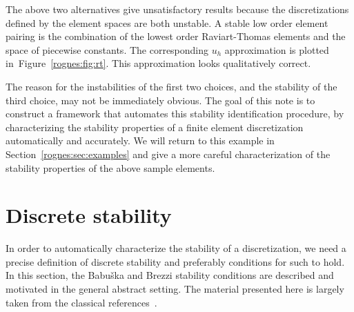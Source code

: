 The above two alternatives give unsatisfactory results because the
discretizations defined by the element spaces are both unstable. A
stable low order element pairing is the combination of the lowest
order Raviart-Thomas elements and the space of piecewise
constants\cite{RaviartThomas1977}. The corresponding $u_h$
approximation is plotted in~Figure~\ref{rognes:fig:rt}. This
approximation looks qualitatively correct.

The reason for the instabilities of the first two choices, and the
stability of the third choice, may not be immediately obvious. The
goal of this note is to construct a framework that automates this
stability identification procedure, by characterizing the stability
properties of a finite element discretization automatically and
accurately.  We will return to this example in
Section~\ref{rognes:sec:examples} and give a more careful
characterization of the stability properties of the above sample
elements.



\section{Discrete stability}

In order to automatically characterize the stability of a
discretization, we need a precise definition of discrete stability and
preferably conditions for such to hold. In this section, the Babu\v
ska and Brezzi stability conditions are described and motivated in the
general abstract setting. The material presented here is largely taken
from the classical references~\cite{Babuska1973, Brezzi1974,
  BrezziFortin1991}.

